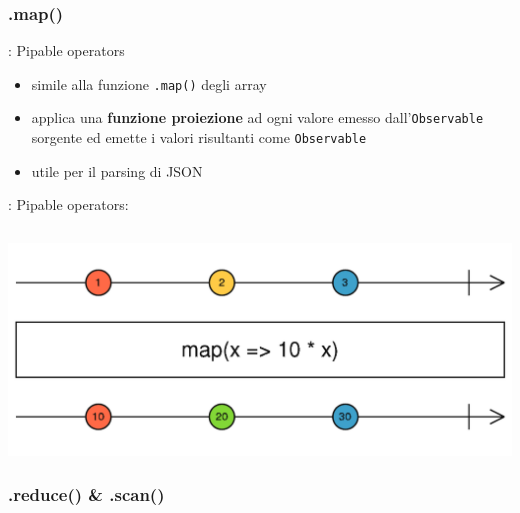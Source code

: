             \subsubsection{.map()}\label{subsub:map}

            \begin{frame}{\insertsubsectionhead}{: Pipable operators}
                \begin{block}{\texttt{\insertsubsubsectionhead}}
                    \begin{itemize}
                        \item
                            simile alla funzione \texttt{.map()} degli array
                        \item
                            applica una \textbf{funzione proiezione} ad ogni valore emesso dall'\texttt{Observable} sorgente ed emette i valori risultanti come \texttt{Observable}
                        \item
                            utile per il parsing di JSON
                    \end{itemize}
                \end{block}

            \end{frame}

            \begin{frame}[fragile]{\insertsubsectionhead}{: Pipable operators: \texttt{\insertsubsubsectionhead}}
                \inputminted{js}{src/map.js}
                \includegraphics[width=\linewidth]{map}
            \end{frame}

            \subsubsection{.reduce() \& .scan()}\label{subsub:reduce}

